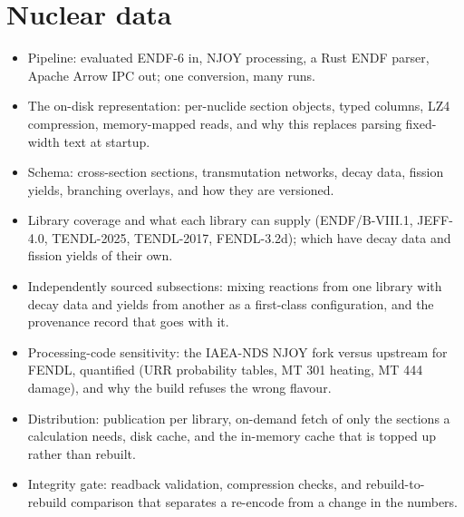 \section{Nuclear data}
\begin{itemize}
  \item Pipeline: evaluated ENDF-6 in, NJOY processing, a Rust ENDF parser,
        Apache Arrow IPC out; one conversion, many runs.
  \item The on-disk representation: per-nuclide section objects, typed
        columns, LZ4 compression, memory-mapped reads, and why this replaces
        parsing fixed-width text at startup.
  \item Schema: cross-section sections, transmutation networks, decay data,
        fission yields, branching overlays, and how they are versioned.
  \item Library coverage and what each library can supply
        (ENDF/B-VIII.1, JEFF-4.0, TENDL-2025, TENDL-2017, FENDL-3.2d);
        which have decay data and fission yields of their own.
  \item Independently sourced subsections: mixing reactions from one library
        with decay data and yields from another as a first-class
        configuration, and the provenance record that goes with it.
  \item Processing-code sensitivity: the IAEA-NDS NJOY fork versus upstream
        for FENDL, quantified (URR probability tables, MT 301 heating,
        MT 444 damage), and why the build refuses the wrong flavour.
  \item Distribution: publication per library, on-demand fetch of only the
        sections a calculation needs, disk cache, and the in-memory cache
        that is topped up rather than rebuilt.
  \item Integrity gate: readback validation, compression checks, and
        rebuild-to-rebuild comparison that separates a re-encode from a
        change in the numbers.
\end{itemize}


